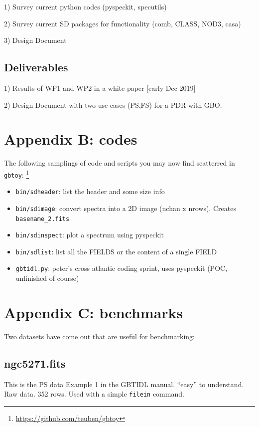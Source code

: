 \documentclass[12pt,a4paper]{article}
\begin{document}
1) Survey current python codes (pyspeckit, specutils)

2) Survey current SD packages for functionality (comb, CLASS, NOD3, casa)

3) Design Document

\subsection{Deliverables}

1) Results of WP1 and WP2 in a white paper [early Dec 2019]

2) Design Document with two use cases (PS,FS) for a PDR with GBO.

\section*{Appendix B: codes}

The following samplings of code and scripts you may now find scatterred in {\tt gbtoy}:
\footnote{\url{https://github.com/teuben/gbtoy}}

\begin{itemize}
  \item {\tt bin/sdheader}:  list the header and some size info
  \item {\tt bin/sdimage}:    convert spectra into a 2D image (nchan x nrows). Creates {\tt basename\_2.fits}
  \item {\tt bin/sdinspect}:  plot a spectrum using pyspeckit
  \item {\tt bin/sdlist}:  list all the FIELDS or the content of a single FIELD
  \item {\tt gbtidl.py}: peter's cross atlantic coding sprint, uses pyspeckit (POC, unfinished of course)
\end{itemize}       

\section*{Appendix C: benchmarks}

Two datasets have come out that are useful for benchmarking:

\subsection{ngc5271.fits}

This is the PS data Example 1 in the GBTIDL manual. ``easy'' to understand. Raw data. 352 rows.  Used with a simple {\tt filein} command.
\end{document}
